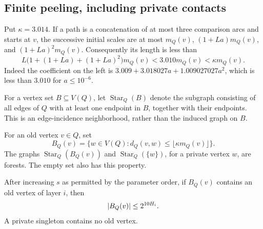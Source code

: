 \subsection{Finite peeling, including private contacts}

Put $\kappa=3.014$.  If a path is a concatenation of at most three comparison
arcs and starts at $v$, the successive initial scales are at most
$m_Q(v)$, $(1+La)m_Q(v)$, and $(1+La)^2m_Q(v)$.  Consequently its length
is less than
\begin{equation}
 L\bigl(1+(1+La)+(1+La)^2\bigr)m_Q(v)
 <3.010m_Q(v)<\kappa m_Q(v).
 \label{eq:three-domain-arcs}
\end{equation}
Indeed the coefficient on the left is
$3.009+3.018027a+1.009027027a^2$, which is less than $3.010$ for
$a\leq10^{-6}$.

For a vertex set $B\subseteq V(Q)$, let $\operatorname{Star}_Q(B)$ denote
the subgraph consisting of all edges of $Q$ with at least one endpoint
in $B$, together with their endpoints.  This is an edge-incidence
neighborhood, rather than the induced graph on $B$.

\begin{lemma}
\label{lem:allowed-domain-sets}
For an old vertex $v\in Q$, set
\[
 B_Q(v)=\{w\in V(Q):d_Q(v,w)\leq\lfloor\kappa m_Q(v)\rfloor\}.
\]
The graphs $\operatorname{Star}_Q(B_Q(v))$ and
$\operatorname{Star}_Q(\{w\})$, for a private vertex $w$, are forests.
The empty set also has this property.

After increasing $s$ as permitted by the parameter order, if $B_Q(v)$
contains an old vertex of layer $i$, then
\begin{equation}
 \left\lvert B_Q(v)\right\rvert\leq 2^{10H_i}.
 \label{eq:domain-ball-cardinality}
\end{equation}
A private singleton contains no old vertex.
\end{lemma}

